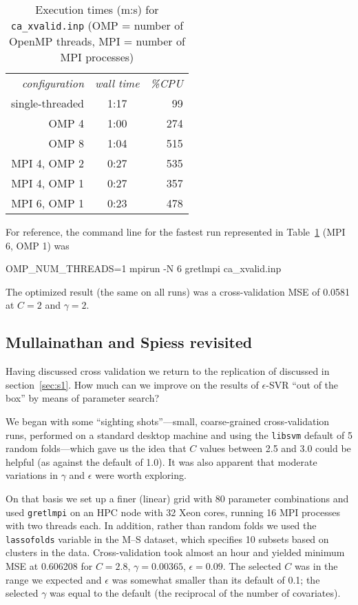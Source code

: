 \documentclass{article}
\begin{document}
\begin{table}[htbp]
\centering
\begin{tabular}{rcr}
\textit{configuration} & \textit{wall time} & \textit{\%CPU} \\
single-threaded & 1:17 & 99 \\
OMP 4 & 1:00 & 274 \\
OMP 8 & 1:04 & 515 \\
MPI 4, OMP 2 & 0:27 & 535 \\
MPI 4, OMP 1 & 0:27 & 357 \\
MPI 6, OMP 1 & 0:23 & 478
\end{tabular}
\caption{Execution times (m:s) for \texttt{ca\_xvalid.inp} (OMP =
  number of OpenMP threads, MPI = number of MPI processes)}
\label{tab:cadata}
\end{table}

For reference, the command line for the fastest run represented in
Table~\ref{tab:cadata} (MPI 6, OMP 1) was
\begin{code}
OMP_NUM_THREADS=1 mpirun -N 6 gretlmpi ca_xvalid.inp
\end{code}
The optimized result (the same on all runs) was a cross-validation MSE
of 0.0581 at $C=2$ and $\gamma=2$.

\clearpage

\subsection{Mullainathan and Spiess revisited}
\label{sec:ms-xvalid}

Having discussed cross validation we return to the replication of
\cite{mull-spiess17} discussed in section~\ref{sec:s1}. How much
can we improve on the results of $\epsilon$-SVR ``out of the
box'' by means of parameter search?

We began with some ``sighting shots''---small, coarse-grained
cross-validation runs, performed on a standard desktop machine and
using the \texttt{libsvm} default of 5 random folds---which gave us
the idea that $C$ values between 2.5 and 3.0 could be helpful (as
against the default of 1.0). It was also apparent that moderate
variations in $\gamma$ and $\epsilon$ were worth exploring.

On that basis we set up a finer (linear) grid with 80 parameter
combinations and used \texttt{gretlmpi} on an HPC node with 32 Xeon
cores, running 16 MPI processes with two threads each. In addition,
rather than random folds we used the \texttt{lassofolds} variable in
the M--S dataset, which specifies 10 subsets based on clusters in the
data. Cross-validation took almost an hour and yielded minimum MSE at
0.606208 for $C=2.8$, $\gamma=0.00365$, $\epsilon=0.09$. The selected
$C$ was in the range we expected and $\epsilon$ was somewhat smaller
than its default of 0.1; the selected $\gamma$ was equal to the
default (the reciprocal of the number of covariates).
\end{document}
